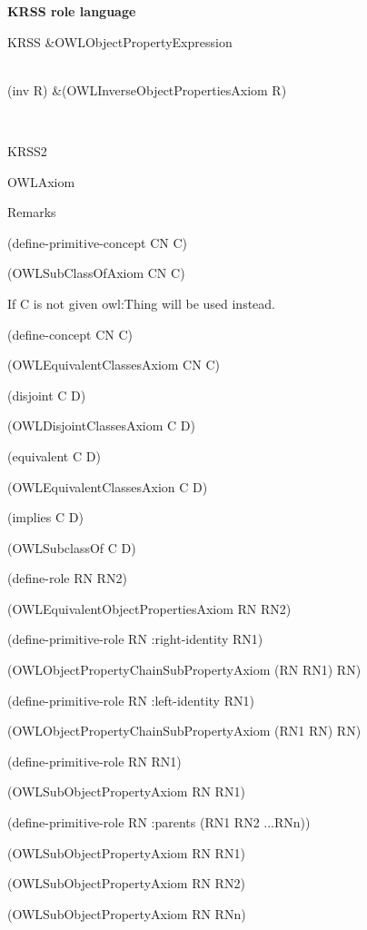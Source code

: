 {\bfseries K\-R\-S\-S role language} \begin{TabularC}{2}
\hline
K\-R\-S\-S &O\-W\-L\-Object\-Property\-Expression  

\\
(inv R) &(O\-W\-L\-Inverse\-Object\-Properties\-Axiom R)  

\\
\end{TabularC}


\begin{TabularC}{0}
\hline
\end{TabularC}
K\-R\-S\-S2 

O\-W\-L\-Axiom 

Remarks 

(define-\/primitive-\/concept C\-N C) 

(O\-W\-L\-Sub\-Class\-Of\-Axiom C\-N C) 

If C is not given owl\-:Thing will be used instead.  

(define-\/concept C\-N C) 

(O\-W\-L\-Equivalent\-Classes\-Axiom C\-N C) 

(disjoint C D) 

(O\-W\-L\-Disjoint\-Classes\-Axiom C D) 

(equivalent C D) 

(O\-W\-L\-Equivalent\-Classes\-Axion C D) 

(implies C D) 

(O\-W\-L\-Subclass\-Of C D) 

(define-\/role R\-N R\-N2) 

(O\-W\-L\-Equivalent\-Object\-Properties\-Axiom R\-N R\-N2) 

(define-\/primitive-\/role R\-N \-:right-\/identity R\-N1) 

(O\-W\-L\-Object\-Property\-Chain\-Sub\-Property\-Axiom (R\-N R\-N1) R\-N) 

(define-\/primitive-\/role R\-N \-:left-\/identity R\-N1) 

(O\-W\-L\-Object\-Property\-Chain\-Sub\-Property\-Axiom (R\-N1 R\-N) R\-N) 

(define-\/primitive-\/role R\-N R\-N1) 

(O\-W\-L\-Sub\-Object\-Property\-Axiom R\-N R\-N1) 

(define-\/primitive-\/role R\-N \-:parents (R\-N1 R\-N2 ...R\-Nn)) 

(O\-W\-L\-Sub\-Object\-Property\-Axiom R\-N R\-N1)\par
 (O\-W\-L\-Sub\-Object\-Property\-Axiom R\-N R\-N2)\par
 (O\-W\-L\-Sub\-Object\-Property\-Axiom R\-N R\-Nn) 

